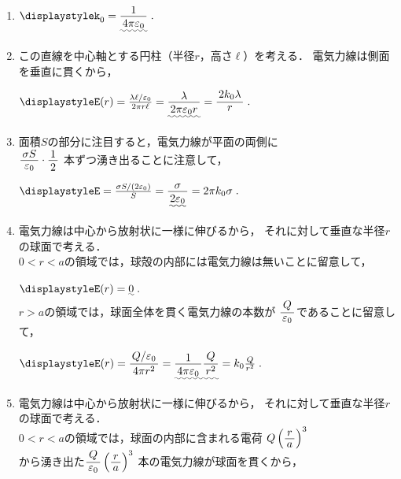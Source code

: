 \documentclass[../../../uem_phy_std_a.tex]{subfiles}
\begin{document}
    \begin{enumerate}
        \item%
            \myspaceb%
            $\displaystyle%
                k_0 = \uwave{\myfraca{1}{4\pi \varepsilon_0}} \;.
            $            
        \item%
            この直線を中心軸とする円柱（半径$r$，高さ$\ell$）を考える．%
            電気力線は側面を垂直に貫くから，
            
            \myspaceb%
            $\displaystyle%
                E(r) = \frac{\lambda \ell / \varepsilon_0}{2\pi r \ell}%
                = \uwave{\myfraca{\lambda}{2\pi \varepsilon_0 r}}%
                = \myfracd{2k_0 \lambda}{r} \;.
            $
        \item%
            面積$S$の部分に注目すると，電気力線が平面の両側に\\
            $\myfracb{\sigma S}{\varepsilon_0} \cdot \myfraca{1}{2}$
            本ずつ湧き出ることに注意して，
            
            \myspaceb%
            $\displaystyle%
                E = \frac{\sigma S/(2\varepsilon_0)}{S} %
                = \uwave{\myfraca{\sigma}{2\varepsilon_0}}%
                = 2\pi k_0 \sigma \;.
            $
        \item%
            電気力線は中心から放射状に一様に伸びるから，%
            それに対して垂直な半径$r$の球面で考える．\\
            \uline{$0<r<a$}の領域では，球殻の内部には電気力線は無いことに留意して，
            
            \myspaceb%
            $\displaystyle%
                E(r) = \uwave{0} \;.
            $\\
            \uline{$r>a$}の領域では，球面全体を貫く電気力線の本数が%
            $\myfracd{Q}{\varepsilon_0}$であることに留意して，
            
            \myspaceb%
            $\displaystyle%
                E(r) = \myfracc{Q/\varepsilon_0}{4\pi r^2}%
                = \uwave{\myfraca{1}{4\pi \varepsilon_0} \myfracc{Q}{r^2}}%
                = k_0 \frac{Q}{r^2} \;.
            $            
        \item%
            電気力線は中心から放射状に一様に伸びるから，%
            それに対して垂直な半径$r$の球面で考える．\\
            \uline{$0<r<a$}の領域では，球面の内部に含まれる電荷%
            $Q \left( \myfracb{r}{a} \right)^3$\\
            から湧き出た$\myfracd{Q}{\varepsilon_0} \left( \myfracb{r}{a} \right)^3$%
            本の電気力線が球面を貫くから，
            

\end{enumerate}
\end{document}
